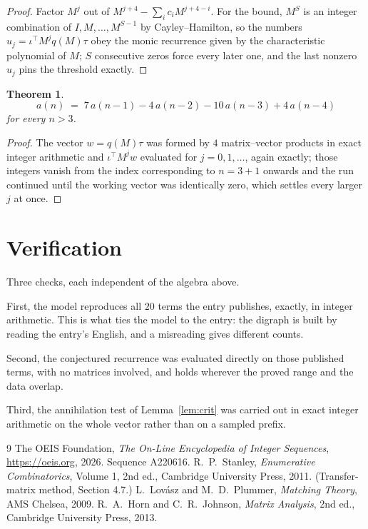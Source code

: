 \documentclass[11pt,a4paper]{article}
\theoremstyle{plain}
\newtheorem{theorem}{Theorem}
\theoremstyle{definition}
\begin{document}
\begin{proof}
Factor $M^{j}$ out of $M^{j+4}-\sum_ic_iM^{j+4-i}$. For the bound, $M^{S}$
is an integer combination of $I,M,\dots,M^{S-1}$ by Cayley--Hamilton, so the numbers
$u_j=\iota^{\!\top}M^{j}q(M)\tau$ obey the monic recurrence given by the characteristic
polynomial of $M$; $S$ consecutive zeros force every later one, and the last nonzero $u_j$
pins the threshold exactly.
\end{proof}

\begin{theorem}
\[
a(n)\;=\;7\,a(n-1) - 4\,a(n-2) - 10\,a(n-3) + 4\,a(n-4)
\]
for every $n>3$.
\end{theorem}

\begin{proof}
The vector $w=q(M)\tau$ was formed by $4$ matrix--vector products in exact integer
arithmetic and $\iota^{\!\top}M^{j}w$ evaluated for $j=0,1,\dots$, again exactly; those
integers vanish from the index corresponding to $n=3+1$ onwards and the run continued
until the working vector was identically zero, which settles every larger $j$ at once.
\end{proof}

\section{Verification}

Three checks, each independent of the algebra above.

First, the model reproduces all $20$ terms the entry publishes, exactly, in integer
arithmetic. This is what ties the model to the entry: the digraph is built by reading the
entry's English, and a misreading gives different counts.

Second, the conjectured recurrence was evaluated directly on those published terms, with no
matrices involved, and holds wherever the proved range and the data overlap.

Third, the annihilation test of Lemma~\ref{lem:crit} was carried out in exact integer
arithmetic on the whole vector rather than on a sampled prefix.

\begin{thebibliography}{9}
 The OEIS Foundation, \emph{The On-Line Encyclopedia of Integer
Sequences}, \url{https://oeis.org}, 2026. Sequence A220616.
 R.~P.~Stanley, \emph{Enumerative Combinatorics}, Volume 1, 2nd ed.,
Cambridge University Press, 2011. (Transfer-matrix method, Section 4.7.)
 L.~Lov\'asz and M.~D.~Plummer, \emph{Matching Theory}, AMS Chelsea,
2009.
 R.~A.~Horn and C.~R.~Johnson, \emph{Matrix Analysis}, 2nd ed., Cambridge
University Press, 2013.
\end{thebibliography}
\end{document}
